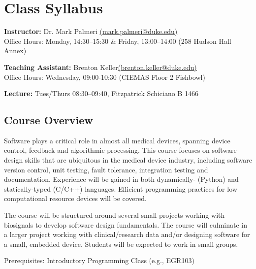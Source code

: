 



\section*{Class Syllabus}

{\bf Instructor:} Dr. Mark Palmeri \href{mailto:mark.palmeri@duke.edu}{(mark.palmeri@duke.edu)}\\
Office Hours: Monday, 14:30--15:30 \& Friday, 13:00--14:00 (258 Hudson Hall Annex)

{\bf Teaching Assistant:} Brenton Keller\href{mailto:brenton.keller@duke.edu}{(brenton.keller@duke.edu)}\\
Office Hours: Wednesday, 09:00-10:30 (CIEMAS Floor 2 Fishbowl)

{\bf Lecture:} Tues/Thurs 08:30--09:40, Fitzpatrick Schiciano B 1466

\subsection*{Course Overview}
Software plays a critical role in almost all medical devices, spanning device control, feedback and algorithmic processing.  This course focuses on software design skills that are ubiquitous in the medical device industry, including software version control, unit testing, fault tolerance, integration testing and documentation.  Experience will be gained in both dynamically- (Python) and statically-typed (C/C++) languages.  Efficient programming practices for low computational resource devices will be covered.

The course will be structured around several small projects working with biosignals to develop software design fundamentals.  The course will culminate in a larger project working with clinical/research data and/or designing software for a small, embedded device.  Students will be expected to work in small groups.

Prerequisites: Introductory Programming Class (e.g., EGR103)

